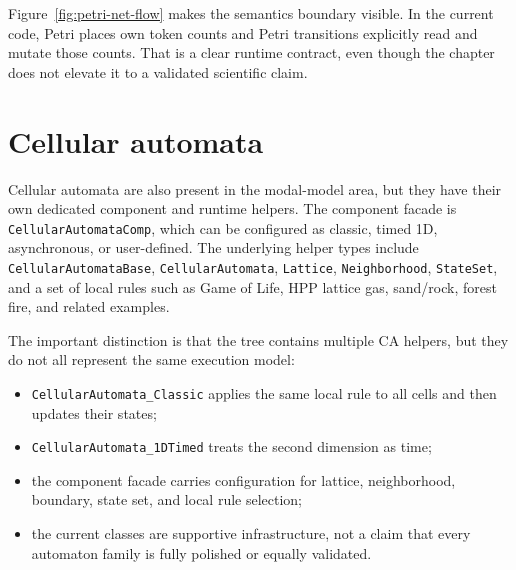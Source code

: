Figure~\ref{fig:petri-net-flow} makes the semantics boundary visible. In the
current code, Petri places own token counts and Petri transitions explicitly
read and mutate those counts. That is a clear runtime contract, even though the
chapter does not elevate it to a validated scientific claim.

\section{Cellular automata}
\label{sec:cellular-automata}

Cellular automata are also present in the modal-model area, but they have their
own dedicated component and runtime helpers. The component facade is
\texttt{CellularAutomataComp}, which can be configured as classic, timed 1D,
asynchronous, or user-defined. The underlying helper types include
\texttt{CellularAutomataBase}, \texttt{CellularAutomata}, \texttt{Lattice},
\texttt{Neighborhood}, \texttt{StateSet}, and a set of local rules such as
Game of Life, HPP lattice gas, sand/rock, forest fire, and related examples.

The important distinction is that the tree contains multiple CA helpers, but
they do not all represent the same execution model:
\begin{itemize}
\item \texttt{CellularAutomata\_Classic} applies the same local rule to all
  cells and then updates their states;
\item \texttt{CellularAutomata\_1DTimed} treats the second dimension as time;
\item the component facade carries configuration for lattice, neighborhood,
  boundary, state set, and local rule selection;
\item the current classes are supportive infrastructure, not a claim that every
  automaton family is fully polished or equally validated.
\end{itemize}

